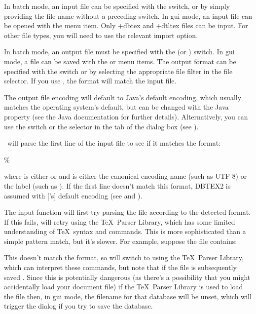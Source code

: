 In batch mode, an input file can be specified with the 
switch, or by simply providing the file name without a preceding switch.
In \gls{gui} mode, an input file can be opened with the
 menu item. Only \ext+{dbtex} and \ext+{dtltex} files can be
input. For other file types, you will need to use the relevant
import option.

In batch mode, an output file must be specified with the
 (or ) switch. In \gls{gui} mode, a file
can be saved with the  or  menu
items. The output format can be specified with the
 switch or by selecting the appropriate file
filter in the  file selector. If you use
, the format will match the input file.

The output file encoding will default to Java's default
encoding, which usually matches the operating system's default, but
can be changed with the Java  property (see the
Java documentation for further details). Alternatively, you can use
the  switch or the selector in the
 tab of the 
dialog box (see ).

\appname\ will parse the first line of the input file to see if it
matches the format:
\begin{compactcodebox}
\%  
\end{compactcodebox}
where  is either  or  and
 is either the canonical encoding name (such as
UTF-8) or the  label (such as ).
If the first line doesn't match this format, \gls{DBTEX2} is
assumed with ['s] default encoding (see
 and ).

The  input function will first try parsing the file
according to the detected format.  If this fails, 
will retry using the \TeX\ Parser Library, which has some limited
understanding of \TeX\ syntax and  commands.
This is more sophisticated than a simple pattern match, but it's slower.
For example, suppose the file contains:

This doesn't match the  format, so  will
switch to using the \TeX\ Parser Library, which can interpret these
commands, but note that if the file is subsequently saved
. Since this is
potentially dangerous (as there's a possibility that you might
accidentally load your document  file) if the 
\TeX\ Parser Library is used to load the file then, in \gls{gui}
mode, the filename for that database will be unset, which will 
trigger the  dialog if you try to save the database.

